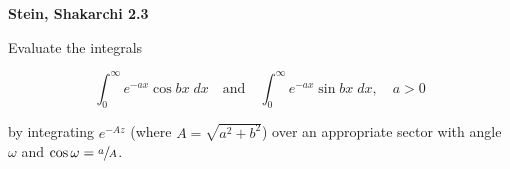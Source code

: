 \textbf{Stein, Shakarchi 2.3}

Evaluate the integrals 

$$
\int_{0}^{\infty} {e^{-ax} \cos{bx} \; dx} \quad \text{and} \quad \int_{0}^{\infty} {e^{-ax} \sin{bx} \; dx}, \quad a > 0
$$

by integrating $e^{-Az}$ (where $A = \sqrt{a^2 + b^2}$) over an appropriate sector with angle $\omega$ and 
$\cos{\omega} = \sfrac{a}{A}$.

\begin{solution}
    \ \\
\end{solution}
